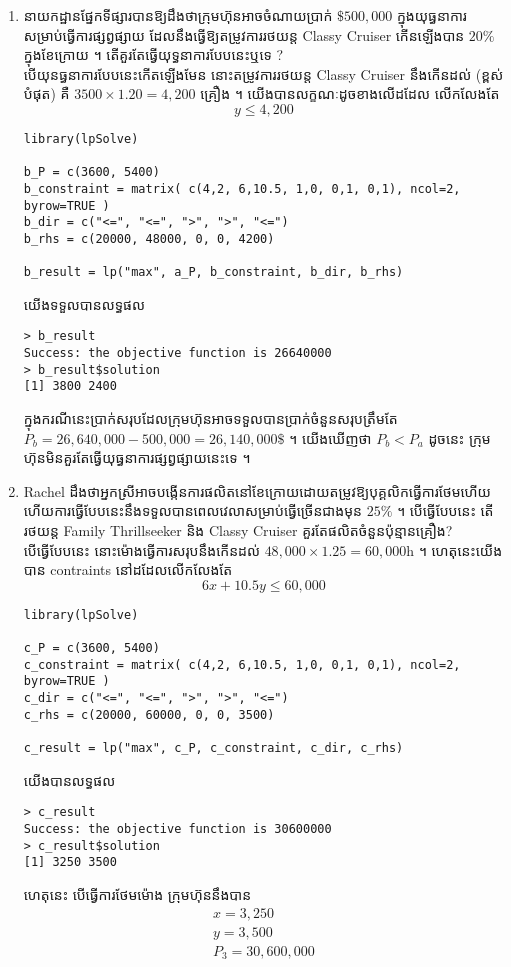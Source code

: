 \begin{enumerate}[label={\textbf{(\alph*)}}]
 
 \item នាយកដ្ឋានផ្នែកទីផ្សារបានឱ្យដឹងថាក្រុមហ៊ុនអាចចំណាយប្រាក់ $\$500,000$
   ក្នុងយុធ្ធនាការសម្រាប់ធ្វើការផ្សព្វផ្សាយ ដែលនឹងធ្វើឱ្យតម្រូវការរថយន្ត Classy Cruiser កើនឡើងបាន
   $20\%$ ក្នុងខែក្រោយ ។ តើគួរតែធ្វើយុទ្ធនាការបែបនេះឬទេ ?\\[2cm]

   បើយុនធ្ធនាការបែបនេះកើតឡើងមែន នោះតម្រូវការរថយន្ត Classy Cruiser នឹងកើនដល់ (ខ្ពស់បំផុត)
   គឺ $3500\times 1.20=4,200$ គ្រឿង ។ យើងបានលក្ខណៈដូចខាងលើដដែល លើកលែងតែ
   \[y\leq 4,200\]
  \begin{lstlisting}
library(lpSolve)

b_P = c(3600, 5400)
b_constraint = matrix( c(4,2, 6,10.5, 1,0, 0,1, 0,1), ncol=2, byrow=TRUE )
b_dir = c("<=", "<=", ">", ">", "<=")
b_rhs = c(20000, 48000, 0, 0, 4200)

b_result = lp("max", a_P, b_constraint, b_dir, b_rhs)
  \end{lstlisting}
   យើងទទួលបានលទ្ធផល
   \begin{verbatim}
> b_result
Success: the objective function is 26640000 
> b_result$solution
[1] 3800 2400
   \end{verbatim}
   ក្នុងករណីនេះប្រាក់សរុបដែលក្រុមហ៊ុនអាចទទួលបានប្រាក់ចំនួនសរុបត្រឹមតែ
   $P_b=26,640,000-500,000=26,140,000\$$ ។
   យើងឃើញថា $P_b<P_a$
   ដូចនេះ ក្រុមហ៊ុនមិនគួរតែធ្វើយុ​ធ្ធនាការផ្សព្វផ្សាយនេះទេ ។
  
\item Rachel ដឹងថាអ្នកស្រីអាចបង្កើនការផលិតនៅខែក្រោយដោយតម្រូវឱ្យបុគ្គលិកធ្វើការថែមហើយ
  ហើយការធ្វើបែបនេះនឹងទទួលបានពេលវេលាសម្រាប់ធ្វើច្រើនជាងមុន $25\%$ ។ បើធ្វើបែបនេះ
  តើរថយន្ត Family Thrillseeker និង Classy Cruiser គួរតែផលិតចំនួនប៉ុន្មានគ្រឿង? \\[1cm]
  បើធ្វើបែបនេះ នោះម៉ោងធ្វើការសរុបនឹងកើនដល់ $48,000\times 1.25=60,000$h ។
  ហេតុនេះយើងបាន contraints នៅដដែលលើកលែងតែ
  \[6x+10.5y\leq 60,000\]

  \begin{lstlisting}
library(lpSolve)

c_P = c(3600, 5400)
c_constraint = matrix( c(4,2, 6,10.5, 1,0, 0,1, 0,1), ncol=2, byrow=TRUE )
c_dir = c("<=", "<=", ">", ">", "<=")
c_rhs = c(20000, 60000, 0, 0, 3500)

c_result = lp("max", c_P, c_constraint, c_dir, c_rhs)
  \end{lstlisting}
   យើងបានលទ្ធផល
   \begin{verbatim}
> c_result 
Success: the objective function is 30600000 
> c_result$solution 
[1] 3250 3500
   \end{verbatim}
   ហេតុនេះ បើធ្វើការថែមម៉ោង ក្រុមហ៊ុននឹងបាន
   \begin{align*}
     x=3,250\\
     y=3,500\\
     P_3=30,600,000 
   \end{align*}


\end{enumerate}
